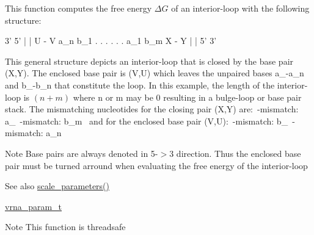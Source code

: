 This function computes the free energy $\Delta G$ of an interior-\/loop with the following structure\+: ~\newline
 
\begin{DoxyPre}
      3'  5'
      |   |
      U - V
  a\_n       b\_1
   .        .
   .        .
   .        .
  a\_1       b\_m
      X - Y
      |   |
      5'  3'
\end{DoxyPre}
 This general structure depicts an interior-\/loop that is closed by the base pair (X,Y). The enclosed base pair is (V,U) which leaves the unpaired bases a\+\_-\/a\+\_\+n and b\+\_-\/b\+\_\+n that constitute the loop. In this example, the length of the interior-\/loop is $(n+m)$ where n or m may be 0 resulting in a bulge-\/loop or base pair stack. The mismatching nucleotides for the closing pair (X,Y) are\+:~\textquotesingle{}-\/mismatch\+: a\+\_~\textquotesingle{}-\/mismatch\+: b\+\_\+m~\newline
 and for the enclosed base pair (V,U)\+:~\textquotesingle{}-\/mismatch\+: b\+\_~\textquotesingle{}-\/mismatch\+: a\+\_\+n~\newline
 \begin{DoxyNote}{Note}
Base pairs are always denoted in 5\textquotesingle{}-\/$>$3\textquotesingle{} direction. Thus the enclosed base pair must be \textquotesingle{}turned arround\textquotesingle{} when evaluating the free energy of the interior-\/loop 
\end{DoxyNote}
\begin{DoxySeeAlso}{See also}
\hyperlink{group__energy__parameters_ga541f2cf7436e9bc939b0a49b24baf987}{scale\+\_\+parameters()} 

\hyperlink{group__energy__parameters_ga8a69ca7d787e4fd6079914f5343a1f35}{vrna\+\_\+param\+\_\+t} 
\end{DoxySeeAlso}
\begin{DoxyNote}{Note}
This function is threadsafe
\end{DoxyNote}

